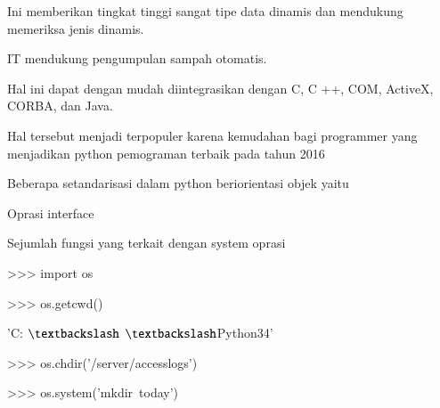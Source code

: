 \noindent 
{\fontsize{14pt}{14pt}\selectfont Ini memberikan tingkat tinggi sangat tipe data dinamis dan mendukung memeriksa jenis dinamis. \\} \par
\noindent 
{\fontsize{14pt}{14pt}\selectfont IT mendukung pengumpulan sampah otomatis. \\} \par
\noindent 
{\fontsize{14pt}{14pt}\selectfont Hal ini dapat dengan mudah diintegrasikan dengan C, C ++, COM, ActiveX, CORBA, dan Java. \\} \par
\noindent 
{\fontsize{14pt}{14pt}\selectfont Hal tersebut menjadi terpopuler karena kemudahan bagi programmer yang menjadikan python pemograman terbaik pada tahun 2016  \\} \par
\vspace{14pt}
\noindent 
{\fontsize{14pt}{14pt}\selectfont Beberapa setandarisasi dalam python beriorientasi objek yaitu \\} \par
\vspace{14pt}
\noindent 
{\fontsize{14pt}{14pt}\selectfont Oprasi interface \\} \par
\noindent 
{\fontsize{14pt}{14pt}\selectfont Sejumlah fungsi yang terkait dengan system oprasi \\} \par
\vspace{14pt}
\noindent 
{\fontsize{14pt}{14pt}\selectfont >>> import os \\} \par
\vspace{14pt}
\noindent 
{\fontsize{14pt}{14pt}\selectfont >>> os.getcwd()~~~~~  \\} \par
\noindent 
{\fontsize{14pt}{14pt}\selectfont 'C: $  \textbackslash  $ $  \textbackslash  $Python34' \\} \par
\vspace{14pt}
\noindent 
{\fontsize{14pt}{14pt}\selectfont >>> os.chdir('/server/accesslogs') \\} \par
\vspace{14pt}
\noindent 
{\fontsize{14pt}{14pt}\selectfont >>> os.system('mkdir~today')~   \\} \par
\noindent 
{\fontsize{14pt}{14pt} \\} \par

